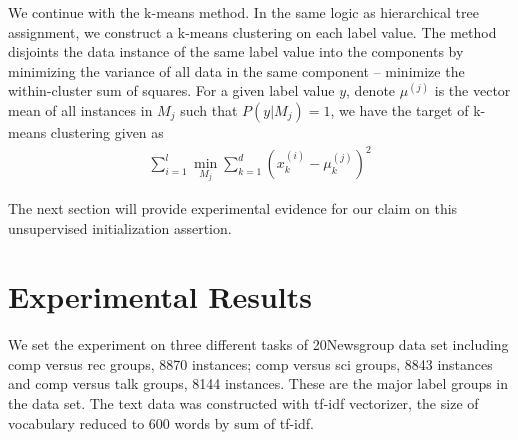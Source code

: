 We continue with the k-means method. In the same logic as hierarchical tree assignment, we construct a k-means clustering on each label value. The method disjoints the data instance of the same label value into the components by minimizing the variance of all data in the same component -- minimize the within-cluster sum of squares. For a given label value $y$, denote $\mu^{(j)}$ is the vector mean of all instances in $M_j$ such that $P(y|M_j) = 1$, we have the target of k-means clustering given as
\begin{align}
	\sum_{i=1}^{l}{
		\min_{M_j} {
			\sum_{k=1}^{d}{(x^{(i)}_k - \mu^{(j)}_k)^2}
		}
	}
\end{align}

The next section will provide experimental evidence for our claim on this unsupervised initialization assertion.

\section{Experimental Results}
\label{sec2: exp results}
We set the experiment on three different tasks of 20Newsgroup data set including comp versus rec groups, 8870 instances; comp versus sci groups, 8843 instances and comp versus talk groups, 8144 instances. These are the major label groups in the data set. The text data was constructed with tf-idf vectorizer, the size of vocabulary reduced to 600 words by sum of tf-idf.


